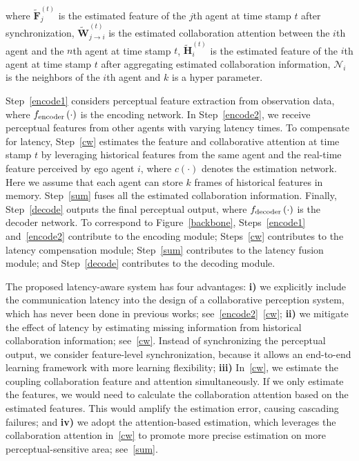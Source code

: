 \documentclass[runningheads]{llncs}
\begin{document}
where $\widetilde{\mathbf{F}}_j^{\left(t\right)}$ is the estimated feature of the $j$th agent at time stamp $t$ after synchronization, $\widetilde{\mathbf{W}}^{\left(t\right)}_{j\rightarrow i}$ is the estimated collaboration attention between the $i$th agent and the $n$th agent at time stamp $t$, $\widetilde{\mathbf{H}}^{\left(t\right)}_i$ is the estimated feature of the $i$th agent at time stamp $t$ after aggregating estimated collaboration information, $\mathcal{N}_i$ is the neighbors of the $i$th agent and $k$ is a hyper parameter. 

Step~\eqref{encode1} considers perceptual feature extraction from observation data, where $f_{\rm encoder}\left(\cdot\right)$ is the encoding network. In Step~\eqref{encode2}, we receive perceptual features from other agents with varying latency times. To compensate for latency, Step~\eqref{cw} estimates the feature and collaborative attention at time stamp $t$ by leveraging historical features from the same agent and the real-time feature perceived by ego agent $i$, where $c\left(\cdot\right)$ denotes the estimation network. Here we assume that each agent can store $k$ frames of historical features in memory. 
Step~\eqref{sum} fuses all the estimated collaboration information. Finally, Step~\eqref{decode} outputs the final perceptual output, where $f_{\rm decoder}\left(\cdot\right)$ is the decoder network. To correspond to Figure~\ref{backbone}, Steps~\eqref{encode1} and~\eqref{encode2} contribute to the encoding module; Steps~\eqref{cw} contributes to the latency compensation module; Step~\eqref{sum} contributes to the latency fusion module; and Step~\eqref{decode} contributes to the decoding module.

The proposed latency-aware system has four advantages: {\bf i)} we explicitly include the communication latency into the design of a collaborative perception system, which has never been done in previous works; see~\eqref{encode2}~\eqref{cw}; {\bf ii)} we mitigate the effect of latency by estimating missing information from historical collaboration information; see~\eqref{cw}. Instead of synchronizing the perceptual output, we consider feature-level synchronization, because it allows an end-to-end learning framework with more learning flexibility; {\bf iii)} In~\eqref{cw}, we estimate the coupling collaboration feature and attention simultaneously. If we only estimate the features, we would need to calculate the collaboration attention based on the estimated features. This would amplify the estimation error, causing cascading failures; and {\bf iv)} we adopt the attention-based estimation, which leverages the collaboration attention in~\eqref{cw} to promote more precise estimation on more perceptual-sensitive area; see~\eqref{sum}.
\end{document}
